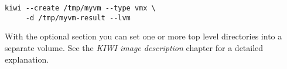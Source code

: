 \begin{Command}{12cm}
\begin{verbatim}
kiwi --create /tmp/myvm --type vmx \
     -d /tmp/myvm-result --lvm
\end{verbatim}
\end{Command}

With the optional  section you can set one or
more top level directories into a separate volume. See the
\textit{KIWI image description} chapter for a detailed explanation.
